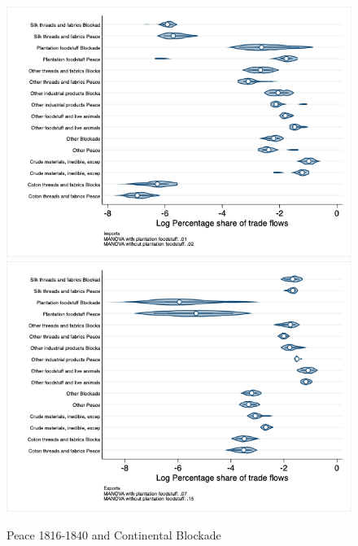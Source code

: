 \documentclass[12pt,a4paper,notitlepage,english]{article}
\begin{document}
\begin{appendix}
\begin{figure}[h!]
\centering
\caption{Peace 1816-1840 and Continental Blockade}
\label{peace1816_1840_block_nat_distr_aggr}
\includegraphics[scale=.4]{peace1816_1840_block_nat_distr_Iaggr}
\includegraphics[scale=.4]{peace1816_1840_block_nat_distr_Xaggr}
\end{figure}


\end{appendix}
\end{document}
